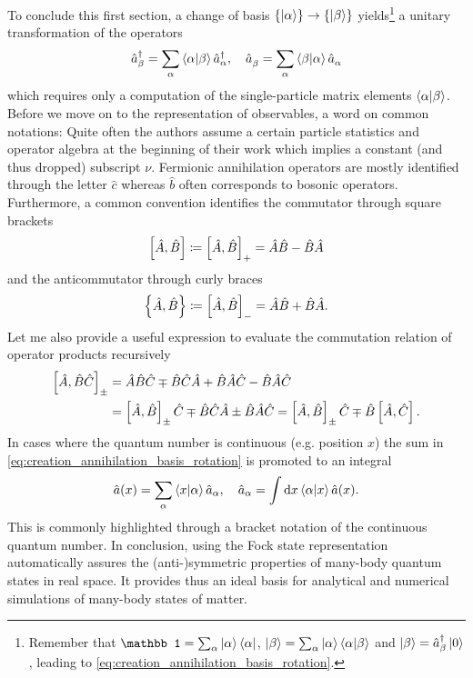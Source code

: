 To conclude this first section, a change of basis $\{\ket\alpha\}\rightarrow\{\ket\beta\}$ yields\footnote{Remember that $\mathbb1 = \sum_\alpha\ket{\alpha}\bra{\alpha}$, $\ket{\beta} = \sum_\alpha\ket{\alpha}\braket{\alpha|\beta}$ and $\ket{\beta}=\hat a^\dag_\beta\ket{0}$, leading to \cref{eq:creation_annihilation_basis_rotation}.} a unitary transformation of the operators
\begin{align}
    \hat a^\dag_\beta = \sum_\alpha \braket{\alpha|\beta}\hat a^\dag_\alpha,
    \quad
    \hat a^\pdag_\beta = \sum_\alpha \braket{\beta|\alpha}\hat a^\pdag_\alpha
    \label{eq:creation_annihilation_basis_rotation}
\end{align}
which requires only a computation of the single-particle matrix elements $\braket{\alpha|\beta}$.
Before we move on to the representation of observables, a word on common notations: Quite often the authors assume a certain particle statistics and operator algebra at the beginning of their work which implies a constant (and thus dropped) subscript $\nu$.
Fermionic annihilation operators are mostly identified through the letter $\hat c$ whereas $\hat b$ often corresponds to bosonic operators.
Furthermore, a common convention identifies the commutator through square brackets
\begin{align}
    \left[\hat A,\hat B\right]\coloneqq\left[ \hat A,\hat B \right]_+ = \hat A\hat B - \hat B\hat A
\end{align}
and the anticommutator through curly braces
\begin{align}
    \left\{ \hat A,\hat B \right\}\coloneqq\left[ \hat A,\hat B \right]_- = \hat A\hat B + \hat B\hat A.
\end{align}
Let me also provide a useful expression to evaluate the commutation relation of operator products recursively
\begin{align}
    \left[ \hat A, \hat B \hat C \right]_\pm
    &= \hat A\hat B\hat C \mp \hat B\hat C\hat A + \hat B\hat A\hat C - \hat B\hat A\hat C
    \\
    &= \left[ \hat A, \hat B \right]_\pm\hat C \mp \hat B\hat C\hat A \pm \hat B\hat A\hat C
    = \left[ \hat A, \hat B \right]_\pm\hat C \mp \hat B\left[ \hat A,\hat C \right].
    \label{eq:recursive_commutation}
\end{align}
In cases where the quantum number is continuous (e.g. position $x$) the sum in \cref{eq:creation_annihilation_basis_rotation} is promoted to an integral
\begin{align}
    \hat a(x) = \sum_\alpha \braket{x | \alpha} \hat a_\alpha,
    \quad
    \hat a_\alpha = \int{\mathrm dx} \braket{\alpha | x} \hat a(x).
\end{align}
This is commonly highlighted through a bracket notation of the continuous quantum number.
In conclusion, using the Fock state representation automatically assures the (anti-)symmetric properties of many-body quantum states in real space.
It provides thus an ideal basis for analytical and numerical simulations of many-body states of matter.

